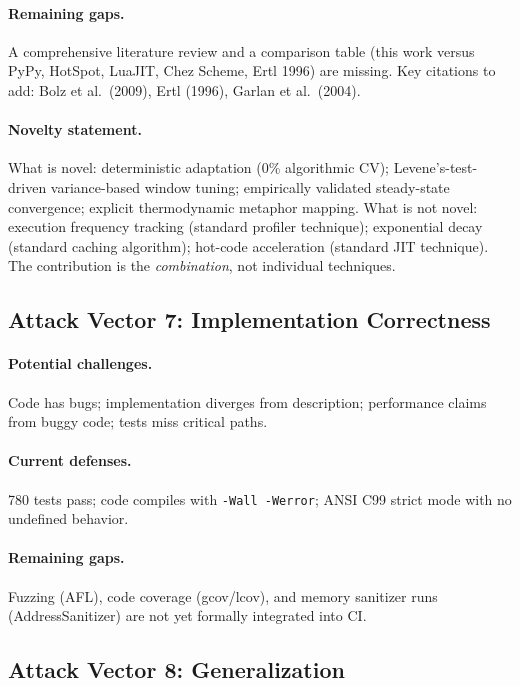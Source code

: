 \paragraph{Remaining gaps.}
A comprehensive literature review and a comparison table (this work versus
PyPy, HotSpot, LuaJIT, Chez Scheme, Ertl 1996) are missing. Key citations
to add: Bolz et al.\ (2009), Ertl (1996), Garlan et al.\ (2004).

\paragraph{Novelty statement.}
What is novel: deterministic adaptation (0\% algorithmic CV); Levene's-test-
driven variance-based window tuning; empirically validated steady-state
convergence; explicit thermodynamic metaphor mapping. What is not novel:
execution frequency tracking (standard profiler technique); exponential decay
(standard caching algorithm); hot-code acceleration (standard JIT technique).
The contribution is the \emph{combination}, not individual techniques.

\subsection{Attack Vector 7: Implementation Correctness}

\paragraph{Potential challenges.}
Code has bugs; implementation diverges from description; performance claims
from buggy code; tests miss critical paths.

\paragraph{Current defenses.}
780\raisebox{0.5ex}{+} tests pass; code compiles with \texttt{-Wall
-Werror}; ANSI C99 strict mode with no undefined behavior.

\paragraph{Remaining gaps.}
Fuzzing (AFL\raisebox{0.5ex}{+}), code coverage (gcov/lcov), and memory
sanitizer runs (AddressSanitizer) are not yet formally integrated into CI.

\subsection{Attack Vector 8: Generalization}

